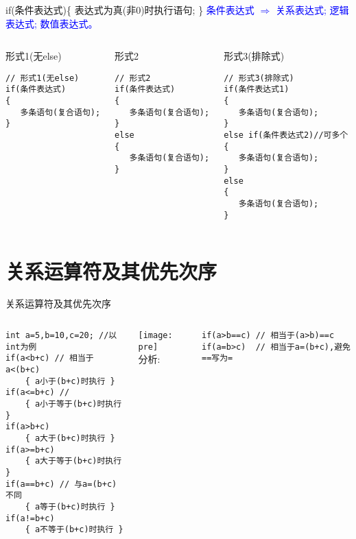 \begin{frame}{if(条件表达式)\{ 表达式为真(非0)时执行语句; \}}
\textcolor{blue}{条件表达式 $\Rightarrow$ 关系表达式; 逻辑表达式; 数值表达式。}
\begin{columns}[t]
\begin{beamerboxesrounded}{形式1(无else)}
\begin{lstlisting}
// 形式1(无else)
if(条件表达式)
{
   多条语句(复合语句);
}
\end{lstlisting}
\end{beamerboxesrounded}
\begin{beamerboxesrounded}{形式2}
\begin{lstlisting}
// 形式2
if(条件表达式)
{
   多条语句(复合语句);
}
else
{
   多条语句(复合语句);
}
\end{lstlisting} 
\end{beamerboxesrounded}
\begin{beamerboxesrounded}{形式3(排除式)}
\begin{lstlisting}
// 形式3(排除式)
if(条件表达式1)
{
   多条语句(复合语句);
}
else if(条件表达式2)//可多个
{
   多条语句(复合语句);
}
else
{
   多条语句(复合语句);
}
\end{lstlisting}
\end{beamerboxesrounded}
\end{columns}                        
\end{frame}

\section{关系运算符及其优先次序}

\begin{frame}{关系运算符及其优先次序}
\begin{columns}%
\begin{lstlisting}
int a=5,b=10,c=20; //以int为例
if(a<b+c) // 相当于a<(b+c)
	{ a小于(b+c)时执行 }
if(a<=b+c) // 
	{ a小于等于(b+c)时执行 }
if(a>b+c) 
	{ a大于(b+c)时执行 }
if(a>=b+c) 
	{ a大于等于(b+c)时执行 }
if(a==b+c) // 与a=(b+c)不同
	{ a等于(b+c)时执行 }
if(a!=b+c) 
	{ a不等于(b+c)时执行 }
\end{lstlisting}
\texttt{[image: pre]}\\
分析:
\begin{lstlisting}
if(a>b==c) // 相当于(a>b)==c
if(a=b>c)  // 相当于a=(b+c),避免==写为=
\end{lstlisting}
\end{columns}
\end{frame}

